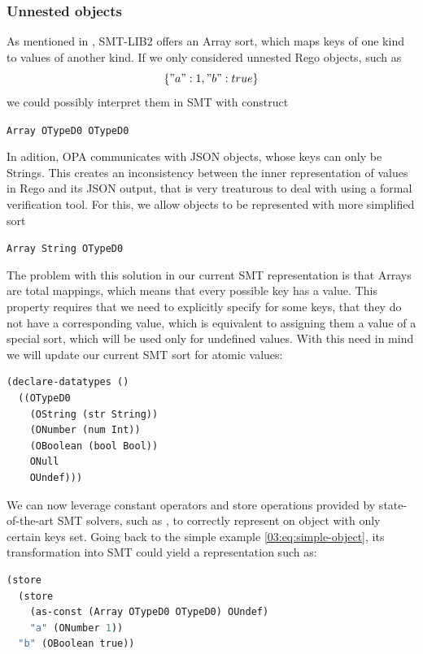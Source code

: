 
\subsubsection{Unnested objects}

As mentioned in , SMT-LIB2 offers an Array sort, which maps keys of one kind to values of another kind.
If we only considered unnested Rego objects, such as
\begin{equation}
  \label{03:eq:simple-object}
  \{ "a": 1, "b": true \}
\end{equation}
we could possibly interpret them in SMT with construct
\begin{center}
  \texttt{Array OTypeD0 OTypeD0}
\end{center}

In adition, OPA communicates with JSON objects, whose keys can only be Strings.
This creates an inconsistency between the inner representation of values in Rego and its JSON output, that is very treaturous to deal with using a formal verification tool.
For this, we allow objects to be represented with more simplified sort
\begin{center}
  \texttt{Array String OTypeD0}
\end{center}

The problem with this solution in our current SMT representation is that Arrays are total mappings, which means that every possible key has a value.
This property requires that we need to explicitly specify for some keys, that they do not have a corresponding value, which is equivalent to assigning them a value of a special sort, which will be used only for undefined values.
With this need in mind we will update our current SMT sort for atomic values:

\begin{lstlisting}[language=lisp]
(declare-datatypes ()
  ((OTypeD0
    (OString (str String))
    (ONumber (num Int))
    (OBoolean (bool Bool))
    ONull
    OUndef)))
\end{lstlisting}

We can now leverage constant operators and store operations provided by state-of-the-art SMT solvers, such as \ziii, to correctly represent on object with only certain keys set.
Going back to the simple example \ref{03:eq:simple-object}, its transformation into SMT could yield a representation such as:
\begin{lstlisting}[language=lisp]
(store
  (store
    (as-const (Array OTypeD0 OTypeD0) OUndef)
    "a" (ONumber 1))
  "b" (OBoolean true))
\end{lstlisting}

